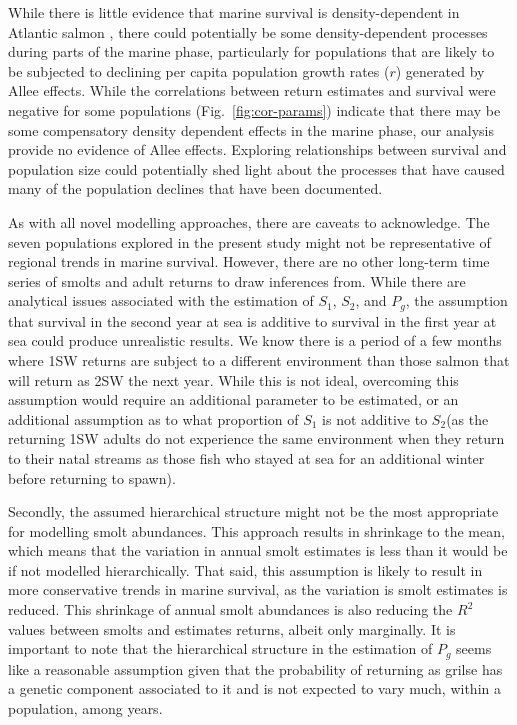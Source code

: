 \documentclass[12pt]{article}
\newcommand{\So}{$S_{1}$\xspace}
\newcommand{\St}{$S_{2}$\xspace}
\newcommand{\Pg}{$P_g$\xspace}
\begin{document}
While there is little evidence that marine survival is density-dependent in
Atlantic salmon \citep{Jonsson1998,Gibson2006}, there could potentially be
some density-dependent processes during parts of the marine phase, 
particularly for populations that are likely to be subjected to
declining per capita population growth rates ($r$) generated by Allee effects.
While the correlations between return estimates and survival were negative for 
some populations (Fig.~\ref{fig:cor-params})
indicate that there may be some compensatory density dependent effects in the 
marine phase, our analysis provide no evidence of Allee effects.
Exploring relationships between survival and population size could potentially
shed light about the processes that have caused many of the population
declines that have been documented.


As with all novel modelling approaches, there are caveats to acknowledge.
The seven populations explored in the present study might not be representative
of regional trends in marine survival. However, there are no other
long-term time series of smolts and adult returns to draw inferences from.
While there are analytical issues associated with the estimation of \So, \St, and \Pg,
the assumption that survival in the second year at sea is additive to survival in the first 
year at sea could produce unrealistic results.
We know there is a period of a few months where 1SW 
returns are subject to a different environment than those salmon that will
return as 2SW the next year. 
While this is not ideal,
overcoming this assumption would require an additional parameter to be
estimated, or an additional assumption as to what proportion of \So is not
additive to \St (as the returning 1SW adults do not experience the same
environment when they return to their natal streams as those fish who stayed
at sea for an additional winter before returning to spawn).

Secondly, the assumed hierarchical structure might not be the most appropriate
for modelling smolt abundances. This approach results in shrinkage to the
mean, which means that the variation in annual smolt estimates is less than
it would be if not modelled hierarchically. 
That said, this assumption is likely to result in more conservative trends in
marine survival, as the variation is smolt estimates is reduced.
This shrinkage of annual smolt abundances is also reducing the $R^2$ values 
between smolts and estimates returns, albeit only marginally.
It is important to note that the hierarchical structure in the estimation of
\Pg seems like a reasonable assumption given that the probability of returning
as grilse has a genetic component associated to it \citep{Aykanat2019} and is
not expected to vary much, within a population, among years.
\end{document}
